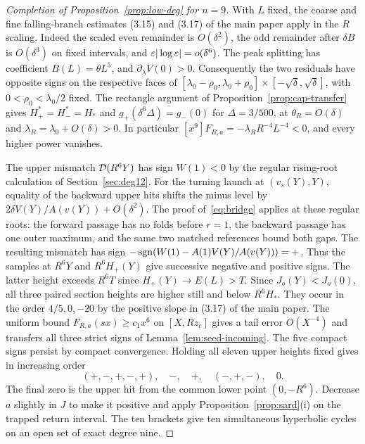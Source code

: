 \begin{proof}[Completion of Proposition~\ref{prop:low-deg} for $n=9$]
With $L$ fixed, the coarse and fine falling-branch estimates
(3.15) and (3.17) of the main paper apply in the $R$ scaling.
Indeed the scaled even remainder is $O(\delta^2)$, the odd remainder
after $\delta B$ is $O(\delta^3)$ on fixed intervals, and
$\varepsilon|\log\varepsilon|=o(\delta^6)$. The peak splitting has coefficient
$B(L)=\theta L^5$, and $\partial_\lambda V(0)>0$.
Consequently the two residuals have opposite signs on the respective
faces of $[\lambda_0-\rho_0,\lambda_0+\rho_0]\times
[-\sqrt\delta,\sqrt\delta]$, with $0<\rho_0<\lambda_0/2$ fixed.
The rectangle argument of Proposition~\ref{prop:cap-transfer} gives
$H_+^*=H_-^*=H_*$ and $g_+(\delta^6\Delta)=g_-(0)$ for
$\Delta=3/500$, at $\theta_R=O(\delta)$ and
$\lambda_R=\lambda_0+O(\delta)>0$. In particular
$[x^9]F_{R,a}=-\lambda_R R^{-4}L^{-4}<0$, and every higher power vanishes.

The upper mismatch $\mathcal{D}(R^6Y)$ has sign $W(1)<0$ by the regular rising-root
calculation of Section~\ref{sec:deg12}. For the turning launch at
$(v_s(Y),Y)$, equality of the backward upper hits shifts the minus
level by $2\delta V(Y)/A(v(Y))+O(\delta^2)$.
The proof of~\eqref{eq:bridge} applies at these regular roots: the
forward passage has no folds before $r=1$, the backward passage has one
outer maximum, and the same two matched references bound both gaps.
The resulting mismatch has sign
$-\operatorname{sgn}(W(1)-A(1)V(Y)/A(v(Y)))=+$. Thus the samples at $R^6Y$ and
$R^6H_+(Y)$ give successive negative and positive signs. The latter
height exceeds $R^6T$ since $H_+(Y)\to E(L)>T$.
Since $J_o(Y)<J_o(0)$, all three paired section heights are higher
still and below $R^6H_*$. They occur in the order $4/5,0,-20$ by the positive slope in (3.17) of the main paper. The uniform bound $F_{R,a}(sx)\ge c_1x^6$
on $[X,Rz_e]$ gives a tail error $O(X^{-4})$ and transfers all three
strict signs of Lemma~\ref{lem:seed-incoming}. The five compact
signs persist by compact convergence. Holding all eleven upper
heights fixed gives in increasing order
\[
  (+,-,+,-,+),\quad -,\quad +,\quad (-,+,-),\quad 0 .
\]
The final zero is the upper hit from the common lower point $(0,-R^6)$.
Decrease $a$ slightly in $J$ to make it positive and apply
Proposition~\ref{prop:sard}(i) on the trapped return interval.
The ten brackets give ten simultaneous hyperbolic cycles on an open
set of exact degree nine.
\end{proof}

